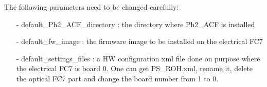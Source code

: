 \documentclass[10pt,a4paper]{article}
\begin{document}
The following parameters need to be changed carefully:
\begin{itemize}
\item[-] default\_Ph2\_ACF\_directory : the directory where Ph2\_ACF is installed
\item[-] default\_fw\_image : the firmware image to be installed on the electrical FC7
\item[-] default\_settings\_files : a HW configuration xml file done on purpose where the electrical FC7 is board 0. One can get PS\_ROH.xml, rename it, delete the optical FC7 part and change the board number from 1 to 0.
\end{itemize}
\end{document}
